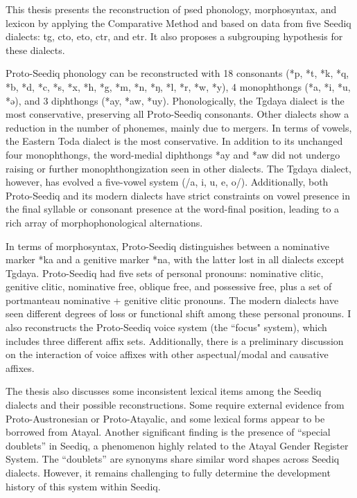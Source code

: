 This thesis presents the reconstruction of \acl{psed} phonology, morphosyntax, and lexicon by applying the Comparative Method and based on data from five Seediq dialects: \acl{tg}, \acl{cto}, \acl{eto}, \acl{ctr}, and \acl{etr}. It also proposes a subgrouping hypothesis for these dialects.

Proto-Seediq phonology can be reconstructed with 18 consonants (*p, *t, *k, *q, *b, *d, *c, *s, *x, *h, *g, *m, *n, *ŋ, *l, *r, *w, *y), 4 monophthongs (*a, *i, *u, *ə), and 3 diphthongs (*ay, *aw, *uy). Phonologically, the Tgdaya dialect is the most conservative, preserving all Proto-Seediq consonants. Other dialects show a reduction in the number of phonemes, mainly due to mergers. In terms of vowels, the Eastern Toda dialect is the most conservative. In addition to its unchanged four monophthongs, the word-medial diphthongs *ay and *aw did not undergo raising or further monophthongization seen in other dialects. The Tgdaya dialect, however, has evolved a five-vowel system (/a, i, u, e, o/). Additionally, both Proto-Seediq and its modern dialects have strict constraints on vowel presence in the final syllable or consonant presence at the word-final position, leading to a rich array of morphophonological alternations.

In terms of morphosyntax, Proto-Seediq distinguishes between a nominative marker *ka and a genitive marker *na, with the latter lost in all dialects except Tgdaya. Proto-Seediq had five sets of personal pronouns: nominative clitic, genitive clitic, nominative free, oblique free, and possessive free, plus a set of portmanteau nominative + genitive clitic pronouns. The modern dialects have seen different degrees of loss or functional shift among these personal pronouns. I also reconstructs the Proto-Seediq voice system (the ``focus" system), which includes three different affix sets. Additionally, there is a preliminary discussion on the interaction of voice affixes with other aspectual/modal and causative affixes.

The thesis also discusses some inconsistent lexical items among the Seediq dialects and their possible reconstructions. Some require external evidence from Proto-Austronesian or Proto-Atayalic, and some lexical forms appear to be borrowed from Atayal. Another significant finding is the presence of ``special doublets'' in Seediq, a phenomenon highly related to the Atayal Gender Register System. The ``doublets'' are synonyms share similar word shapes across Seediq dialects. However, it remains challenging to fully determine the development history of this system within Seediq.

